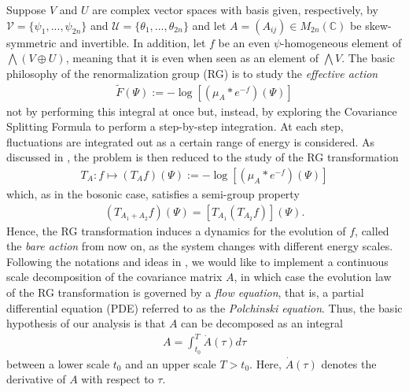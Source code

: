 \documentclass[12pt,twoside]{amsart}
\numberwithin{equation}{section}
\begin{document}
Suppose $V$ and $U$ are complex vector spaces with basis given, respectively, by $\mathcal{V} = \{\psi_{1},...,\psi_{2n}\}$ and $\mathcal{U} = \{\theta_{1},...,\theta_{2n}\}$ and let $A = (A_{ij}) \in M_{2n}(\mathbb{C})$ be skew-symmetric and invertible. In addition, let $f$ be an even $\psi$-homogeneous element of $\bigwedge(V\oplus U)$, meaning that it is even when seen as an element of $\bigwedge V$. The basic philosophy of the renormalization group (RG) is to study the \textit{effective action}
\begin{eqnarray}
\tilde{F}(\Psi) := -\log [(\mu_{A}*e^{-f})(\Psi)]\label{RGT1}
\end{eqnarray}
not by performing this integral at once but, instead, by exploring the Covariance Splitting Formula to perform a step-by-step integration. At each step, fluctuations are integrated out as a certain range of energy is considered. As discussed in \cite{BryKen,BryWri}, the problem is then reduced to the study of the RG transformation
\begin{eqnarray}
T_{A}: f \mapsto (T_{A}f)(\Psi) :=  -\log [(\mu_{A}*e^{-f})(\Psi)] \label{RGT2}
\end{eqnarray}
which, as in the bosonic case, satisfies a semi-group property
\begin{eqnarray}
(T_{A_{1}+A_{2}}f)(\Psi) = [T_{A_{1}}(T_{A_{2}}f)](\Psi). \label{RGT3}
\end{eqnarray}
Hence, the RG transformation induces a dynamics for the evolution of $f$, called the \textit{bare action} from now on, as the system changes with different energy scales. Following the notations and ideas in \cite{BryWri}, we would like to implement a continuous scale decomposition of the covariance matrix $A$, in which case the evolution law of the RG transformation is governed by a \textit{flow equation}, that is, a partial differential equation (PDE) referred to as the \textit{Polchinski equation}. Thus, the basic hypothesis of our analysis is that $A$ can be decomposed as an integral
\begin{eqnarray}
A = \int_{t_{0}}^{T}\dot{A}(\tau)d\tau \label{RGT4}
\end{eqnarray}
between a lower scale $t_{0}$ and an upper scale $T > t_{0}$. Here, $\dot{A}(\tau)$ denotes the derivative of $A$ with respect to $\tau$. 
\end{document}
